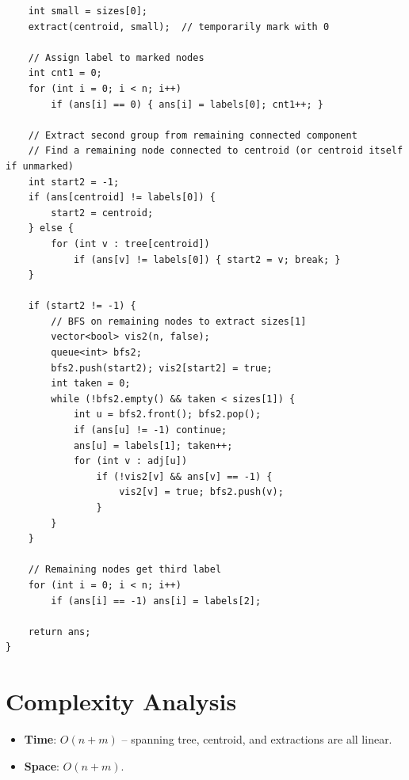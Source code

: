\documentclass[11pt,a4paper]{article}
\begin{document}
\begin{lstlisting}
    int small = sizes[0];
    extract(centroid, small);  // temporarily mark with 0

    // Assign label to marked nodes
    int cnt1 = 0;
    for (int i = 0; i < n; i++)
        if (ans[i] == 0) { ans[i] = labels[0]; cnt1++; }

    // Extract second group from remaining connected component
    // Find a remaining node connected to centroid (or centroid itself if unmarked)
    int start2 = -1;
    if (ans[centroid] != labels[0]) {
        start2 = centroid;
    } else {
        for (int v : tree[centroid])
            if (ans[v] != labels[0]) { start2 = v; break; }
    }

    if (start2 != -1) {
        // BFS on remaining nodes to extract sizes[1]
        vector<bool> vis2(n, false);
        queue<int> bfs2;
        bfs2.push(start2); vis2[start2] = true;
        int taken = 0;
        while (!bfs2.empty() && taken < sizes[1]) {
            int u = bfs2.front(); bfs2.pop();
            if (ans[u] != -1) continue;
            ans[u] = labels[1]; taken++;
            for (int v : adj[u])
                if (!vis2[v] && ans[v] == -1) {
                    vis2[v] = true; bfs2.push(v);
                }
        }
    }

    // Remaining nodes get third label
    for (int i = 0; i < n; i++)
        if (ans[i] == -1) ans[i] = labels[2];

    return ans;
}
\end{lstlisting}

\section{Complexity Analysis}
\begin{itemize}
  \item \textbf{Time}: $O(n + m)$ -- spanning tree, centroid, and extractions are all linear.
  \item \textbf{Space}: $O(n + m)$.
\end{itemize}
\end{document}
